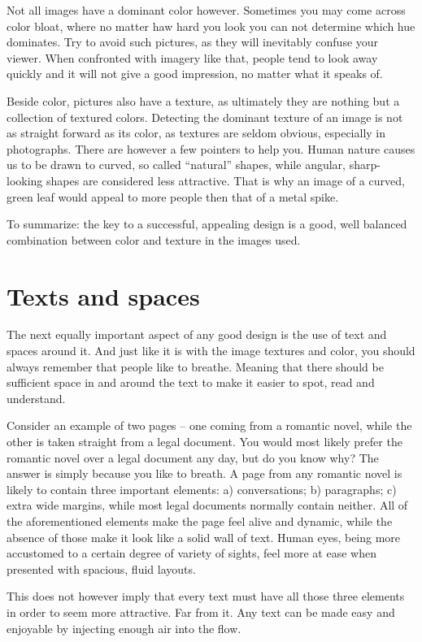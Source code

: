 Not all images have a dominant color however. Sometimes you may come across
color bloat, where no matter haw hard you look you can not determine which hue
dominates. Try to avoid such pictures, as they will inevitably confuse your
viewer. When confronted with imagery like that, people tend to look away quickly
and it will not give a good impression, no matter what it speaks of.

Beside color, pictures also have a texture, as ultimately they are nothing but a
collection of textured colors. Detecting the dominant texture of an image is not as
straight forward as its color, as textures are seldom obvious, especially in
photographs. There are however a few pointers to help you. Human nature causes
us to be drawn to curved, so called ``natural'' shapes, while angular,
sharp-looking shapes are considered less attractive. That is why an image of a
curved, green leaf would appeal to more people then that of a metal spike.

To summarize: the key to a successful, appealing design is a good, well
balanced combination between color and texture in the images used.

\section*{Texts and spaces}

The next equally important aspect of any good design is the use of text and
spaces around it. And just like it is with the image textures and color, you
should always remember that people like to breathe. Meaning that there should be
sufficient space in and around the text to make it easier to spot, read and
understand.

Consider an example of two pages -- one coming from a romantic novel, while the
other is taken straight from a legal document. You would most likely prefer the
romantic novel over a legal document any day, but do you know why? The answer is
simply because you like to breath. A page from any romantic novel is likely to
contain three important elements: a) conversations; b) paragraphs; c) extra wide
margins, while most legal documents normally contain neither. All of the
aforementioned elements make the page feel alive and dynamic, while the absence
of those make it look like a solid wall of text. Human eyes, being more
accustomed to a certain degree of variety of sights, feel more at ease when
presented with spacious, fluid layouts.

This does not however imply that every text must have all those three elements in
order to seem more attractive. Far from it. Any text can be made easy and
enjoyable by injecting enough air into the flow.

